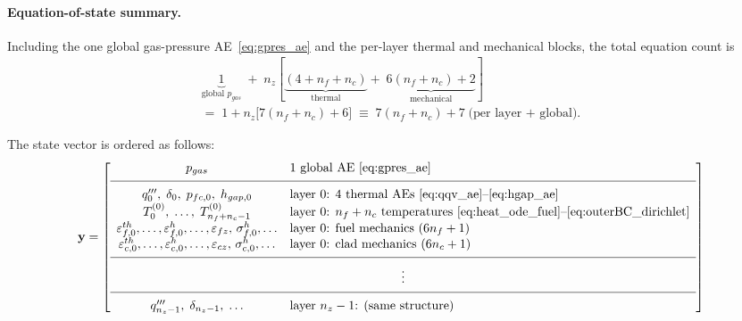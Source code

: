 \begin{refsection}
\paragraph{Equation-of-state summary.} Including the one global gas-pressure AE~\eqref{eq:gpres_ae} and the per-layer thermal and mechanical blocks, the total equation count is
\begin{multline}
  \underbrace{1}_{\text{global }p_{gas}}
  \;+\;
  n_z\!\left[
    \underbrace{(4 + n_f + n_c)}_{\text{thermal}}
    +\;
    \underbrace{6(n_f + n_c) + 2}_{\text{mechanical}}
  \right] \\
  =\; 1 + n_z\bigl[7(n_f + n_c) + 6\bigr]
  \;\equiv\; 7(n_f + n_c) + 7 \;\text{(per layer + global).}
  \label{eq:neq_total}
\end{multline}

The state vector is ordered as follows:
\begin{equation}
  \mathbf{y} =
  \left[
  \begin{array}{cl}
    p_{gas}
      & \text{1 global AE~\eqref{eq:gpres_ae}} \\[4pt]
    \hline \\[-7pt]
    q'''_0,\;\delta_0,\;p_{fc,0},\;h_{gap,0}
      & \text{layer 0: 4 thermal AEs~\eqref{eq:qqv_ae}--\eqref{eq:hgap_ae}} \\
    T^{(0)}_0,\;\ldots,\;T^{(0)}_{n_f+n_c-1}
      & \text{layer 0: $n_f+n_c$ temperatures~\eqref{eq:heat_ode_fuel}--\eqref{eq:outerBC_dirichlet}} \\
    \varepsilon^{th}_{f,0},\ldots,\varepsilon^{h}_{f,0},\ldots,\varepsilon_{fz},\,
    \sigma^{h}_{f,0},\ldots
      & \text{layer 0: fuel mechanics ($6n_f+1$)} \\
    \varepsilon^{th}_{c,0},\ldots,\varepsilon^{h}_{c,0},\ldots,\varepsilon_{cz},\,
    \sigma^{h}_{c,0},\ldots
      & \text{layer 0: clad mechanics ($6n_c+1$)} \\[4pt]
    \hline \\[-7pt]
    \multicolumn{2}{c}{\vdots} \\[4pt]
    \hline \\[-7pt]
    q'''_{n_z-1},\;\delta_{n_z-1},\;\ldots
      & \text{layer $n_z-1$: (same structure)}
  \end{array}
  \right]
  \label{eq:state_vec}
\end{equation}

\printbibliography[heading=subbibliography,title={References}]
\end{refsection}
